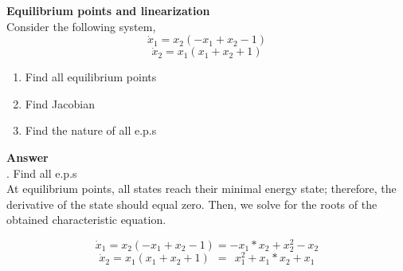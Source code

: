 \documentclass{homeworg}
\begin{document}
\exercise
\noindent
\textbf{Equilibrium points and linearization} \\
Consider the following system,\\
\begin{equation}
\dot{x}_1 = x_2 (-x_1 + x_2 -1)
\end{equation}
\begin{equation}
\dot{x}_2 = x_1 (x_1 + x_2 + 1)
\end{equation}

\begin{enumerate}[label=(\alph*)]
\item Find all equilibrium points
\item Find Jacobian
\item Find the nature of all e.p.s
\end{enumerate}

\noindent
\textbf{Answer} \\
. Find all e.p.s\\
At equilibrium points, all states reach their minimal energy state; therefore,
the derivative of the state should equal zero. Then, we solve for the roots of
the obtained characteristic equation.


\begin{equation}
\dot{x}_1 = x_2 (-x_1 + x_2 -1) = -x_1*x_2 + x_2^2 - x_2
\end{equation}
\begin{equation}
\dot{x}_2 = x_1 (x_1 + x_2 + 1) ~~= ~~ x_1^2 + x_1*x_2 + x_1
\end{equation}
\end{document}
